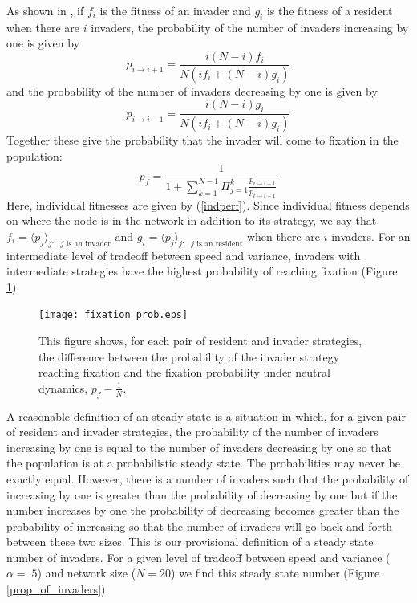 \documentclass{article}
\begin{document}
As shown in \cite{Nowak:2006uq}, if $f_i$ is the fitness of an invader and $g_i$ is the fitness of a resident when there are $i$ invaders, the probability of the number of invaders increasing by one is given by 
\begin{equation}
p_{i\to i+1}=\frac{i(N-i) f_i}{N(if_i+(N-i)g_i)}\label{probup}
 \end{equation}
and the probability of the number of invaders decreasing by one is given by 
\begin{equation}
p_{i\to i-1}=\frac{i(N-i) g_i}{N(if_i+(N-i)g_i)}\label{probdown}
 \end{equation}
 Together these give the probability that the invader will come to fixation in the population:
 \begin{equation}
 p_f=\frac{1}{1+\sum_{k=1}^{N-1}\Pi_{j=1}^k\frac{p_{i\to i+1}}{p_{i\to i-1}}} \label{probfix}
 \end{equation}
Here, individual fitnesses are given by (\ref{indperf}).  Since individual fitness depends on where the node is in the network in addition to its strategy, we say that $f_i=\langle p_j\rangle_{j: \text{ $j$ is an invader} }$ and $g_i=\langle p_j\rangle_{j: \text{ $j$ is an resident} }$ when there are $i$ invaders.   For an intermediate level of tradeoff between speed and variance, invaders with intermediate strategies have the highest probability of reaching fixation (Figure \ref{fixation_prob}).
 
 \begin{figure}
\begin{center}
\texttt{[image: fixation\_prob.eps]}
\end{center}
\caption{ \label{fixation_prob} This figure shows, for each pair of resident and invader strategies, the difference between the probability of the invader strategy reaching fixation and the fixation probability under neutral dynamics, $p_f-\frac{1}{N}$.  }
\end{figure}
 
 
A reasonable definition of an steady state is a situation in which, for a given pair of resident and invader strategies, the probability of the number of invaders increasing by one is equal to the number of invaders decreasing by one so that the population is at a probabilistic steady state.  The probabilities may never be exactly equal.  However, there is a number of invaders such that the probability of increasing by one is greater than the probability of decreasing by one but if the number increases by one the probability of decreasing becomes greater than the probability of increasing so that the number of invaders will go back and forth between these two sizes.  This is our provisional definition of a steady state number of invaders.  For a given level of tradeoff between speed and variance ($\alpha=.5$) and network size ($N=20$) we find this steady state number (Figure \ref{prop_of_invaders}).
\end{document}
